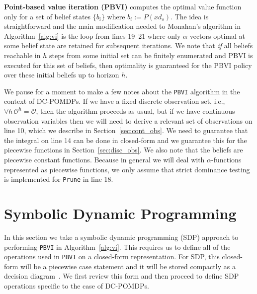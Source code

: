 \documentclass{article} %
\begin{document}
\textbf{Point-based value iteration (PBVI)} computes the optimal value function only for a set of belief states $\{ b_i \}$ where $b_i := P(xd_s)$.  The idea is straightforward and the main modification needed to Monahan's algorithm in Algorithm~\ref{alg:vi} is the loop from lines 19--21 where only $\alpha$-vectors optimal at some belief state are retained for subsequent iterations.  We note that \emph{if} all beliefs reachable in $h$ steps from some initial set can be finitely enumerated and PBVI is executed for this set of beliefs, then optimality is guaranteed for the PBVI policy over these initial beliefs up to horizon $h$.  

We pause for a moment to make a few notes about the \texttt{PBVI}
algorithm in the context of DC-POMDPs.  If we have a fixed discrete
observation set, i.e., $\forall h \, \mathcal{O}^h = \mathcal{O}$, then
the algorithm proceeds as usual, but if we have continuous observation
variables then we will need to derive a relevant set of observations
on line 10, which we describe in Section~\ref{sec:cont_obs}.  We need
to guarantee that the integral on line 14 can be done in closed-form
and we guarantee this for the piecewise functions in
Section~\ref{sec:disc_obs}. We also note that the beliefs are piecewise constant functions. Because in general we will deal with
$\alpha$-functions represented as piecewise functions, we only assume
that strict dominance testing is implemented for \texttt{Prune} in
line 18.


\section{Symbolic Dynamic Programming} 

In this section we take a symbolic dynamic programming (SDP) approach
to performing \texttt{PBVI} in Algorithm~\ref{alg:vi}.  This requires
us to define all of the operations used in \texttt{PBVI} on a
closed-form representation.  For SDP, this closed-form will be a
piecewise case statement and it will be stored compactly as a decision
diagram~\cite{sanner_uai11}.  We first review this form and then
proceed to define SDP operations specific to the case of DC-POMDPs.
\end{document}
